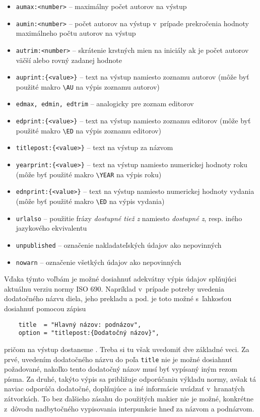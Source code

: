 \documentclass{fithesis3}
\begin{document}
    \begin{itemize}
      \item \texttt{aumax:<number>} -- maximálny počet autorov na výstup
      \item \texttt{aumin:<number>} -- počet autorov na výstup v~prípade prekročenia hodnoty maximálneho počtu autorov na výstup
      \item \texttt{autrim:<number>} -- skrátenie krstných mien na iniciály ak je počet autorov väčší alebo rovný zadanej hodnote
      \item \texttt{auprint:\{<value>\}} -- text na výstup namiesto zoznamu autorov (môže byť použité makro \verb|\AU| na výpis zoznamu autorov)
      \item \texttt{edmax, edmin, edtrim} -- analogicky pre zoznam editorov
      \item \texttt{edprint:\{<value>\}} -- text na výstup namiesto zoznamu editorov (môže byť použité makro \verb|\ED| na výpis zoznamu editorov)
      \item \texttt{titlepost:\{<value>\}} -- text na výstup za názvom
      \item \texttt{yearprint:\{<value>\}} -- text na výstup namiesto numerickej hodnoty roku (môže byť použité makro \verb|\YEAR| na výpis roku)
      \item \texttt{ednprint:\{<value>\}} -- text na výstup namiesto numerickej hodnoty vydania (môže byť použité makro \verb|\ED| na výpis vydania)
      \item \texttt{urlalso} -- použitie frázy \textit{dostupné tiež z} namiesto \textit{dostupné z}, resp. iného jazykového ekvivalentu
      \item \texttt{unpublished} -- označenie nakladateľských údajov ako nepovinných
      \item \texttt{nowarn} -- označenie všetkých údajov ako nepovinných
    \end{itemize}

    Vďaka týmto voľbám je možné dosiahnuť adekvátny výpis údajov splňujúci aktuálnu verziu normy ISO 690. Napríklad v~prípade potreby uvedenia dodatočného názvu diela, jeho prekladu a pod. je toto možné s~ľahkosťou dosiahnuť pomocou zápisu

    \begin{verbatim}
    title  = "Hlavný názov: podnázov",
    option = "titlepost:{Dodatočný názov}",
    \end{verbatim}

    \noindent pričom na výstup dostaneme . Treba si tu však uvedomiť dve základné veci. Za prvé, uvedením dodatočného názvu do poľa \texttt{title} nie je možné dosiahnuť požadované, nakoľko tento dodatočný názov musí byť vypísaný iným rezom písma. Za druhé, takýto výpis sa približuje odporúčaniu výkladu normy, avšak tá naviac odporúča dodatočné, doplňujúce a iné informácie uvádzať v~hranatých zátvorkách. To bez ďalšieho zásahu do použitých makier nie je možné, konkrétne z~dôvodu nadbytočného vypisovania interpunkcie hneď za názvom a podnázvom.
\end{document}
